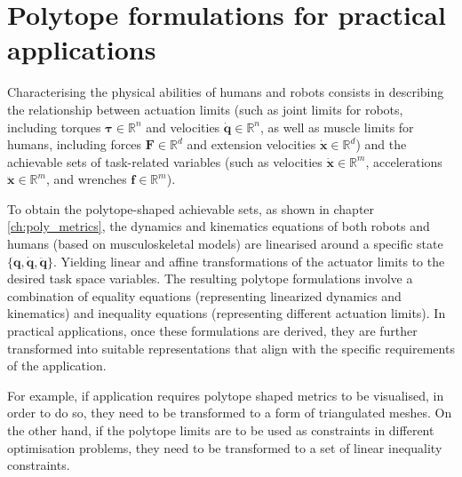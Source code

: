 \section{Polytope formulations for practical applications}
\label{ch:representations_practical_apps}

Characterising the physical abilities of humans and robots consists in describing the relationship between actuation limits (such as joint limits for robots, including torques $\bm{\tau} \in \mathbb{R}^n$ and velocities $\dot{\bm{q}} \in \mathbb{R}^n$, as well as muscle limits for humans, including forces $\bm{F} \in \mathbb{R}^d$ and extension velocities $\dot{\bm{x}} \in \mathbb{R}^d$) and the achievable sets of task-related variables (such as velocities $\dot{\bm{x}}\in \mathbb{R}^m$, accelerations $\ddot{\bm{x}}\in \mathbb{R}^m$, and wrenches $\bm{f}\in \mathbb{R}^m$). 

To obtain the polytope-shaped achievable sets, as shown in chapter \ref{ch:poly_metrics}, the dynamics and kinematics equations of both robots and humans (based on musculoskeletal models) are linearised around a specific state $\{\bm{q},\dot{\bm{q}},\ddot{\bm{q}}\}$. Yielding linear and affine transformations of the actuator limits to the desired task space variables. The resulting polytope formulations involve a combination of equality equations (representing linearized dynamics and kinematics) and inequality equations (representing different actuation limits).
In practical applications, once these formulations are derived, they are further transformed into suitable representations that align with the specific requirements of the application.

For example, if application requires polytope shaped metrics to be visualised, in order to do so, they need to be transformed to a form of triangulated meshes. On the other hand, if the polytope limits are to be used as constraints in different optimisation problems, they need to be transformed to a set of linear inequality constraints. 


